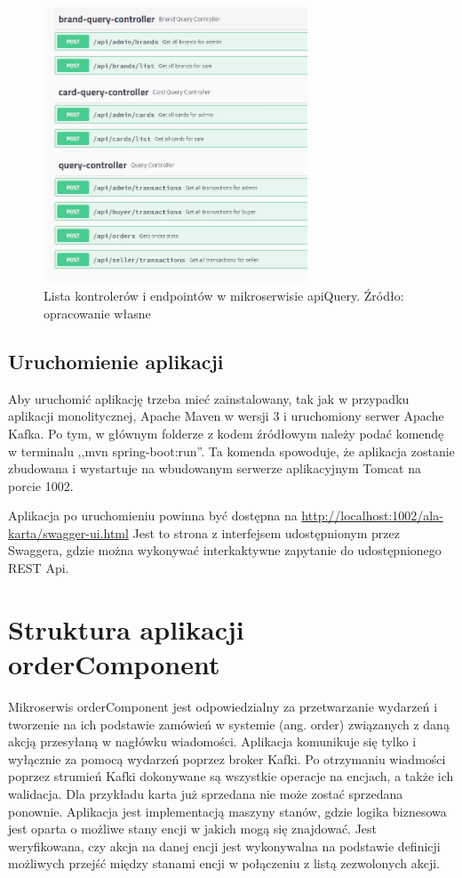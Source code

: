 \begin{figure}[h!]
  \centering
    \includegraphics[width=0.7\textwidth]{images/controllerlistApiQuery.JPG}
  \caption{Lista kontrolerów i endpointów w mikroserwisie apiQuery. Źródło: opracowanie własne }
\end{figure}
\FloatBarrier

\subsection{Uruchomienie aplikacji}
Aby uruchomić aplikację trzeba mieć zainstalowany, tak jak w przypadku aplikacji monolitycznej, Apache Maven w wersji 3 i uruchomiony serwer Apache Kafka.
Po tym, w głównym folderze z kodem źródłowym należy podać komendę w terminalu ,,mvn spring-boot:run''. Ta komenda spowoduje, że aplikacja zostanie zbudowana i wystartuje na wbudowanym serwerze aplikacyjnym Tomcat na porcie 1002.

Aplikacja po uruchomieniu powinna być dostępna na \url{http://localhost:1002/ala-karta/swagger-ui.html}
Jest to strona z interfejsem udostępnionym przez Swaggera, gdzie można wykonywać interkaktywne zapytanie do udostępnionego REST Api.

\section{Struktura aplikacji orderComponent}
Mikroserwis orderComponent jest odpowiedzialny za przetwarzanie wydarzeń i tworzenie na ich podstawie zamówień w systemie (ang. order) związanych z daną akcją przesyłaną w nagłówku wiadomości. Aplikacja komunikuje się tylko i wyłącznie za pomocą wydarzeń poprzez broker Kafki. Po otrzymaniu wiadmości poprzez strumień Kafki dokonywane są wszystkie operacje na encjach, a także ich walidacja. Dla przykładu karta już sprzedana nie może zostać sprzedana ponownie. Aplikacja jest implementacją maszyny stanów, gdzie logika biznesowa jest oparta o możliwe stany encji w jakich mogą się znajdować. Jest weryfikowana, czy akcja na danej encji jest wykonywalna na podstawie definicji możliwych przejść między stanami encji w połączeniu z listą zezwolonych akcji.

